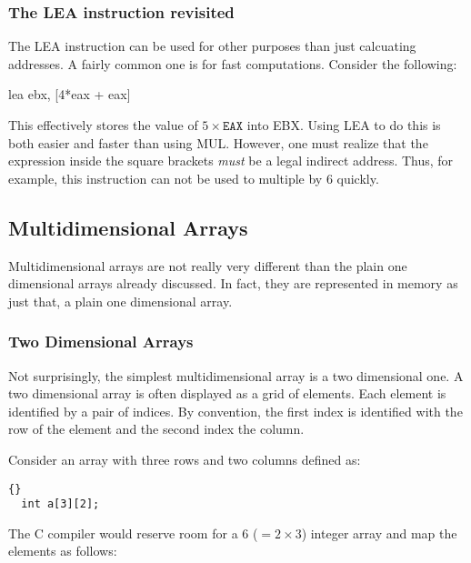 \subsubsection{The {\code LEA} instruction revisited}

The {\code LEA} instruction can be used for other purposes than just
calcuating addresses. A fairly
common one is for fast computations. Consider the following:
\begin{AsmCodeListing}[numbers=none,frame=none]
      lea    ebx, [4*eax + eax]
\end{AsmCodeListing}
This effectively stores the value of $5 \times \mathtt{EAX}$ into EBX.
Using {\code LEA} to do this is both easier and faster than using
{\code MUL}. However, one must realize that the expression
inside the square brackets \emph{must} be a legal indirect address.
Thus, for example, this instruction can not be used to multiple by 6
quickly.


\subsection{Multidimensional Arrays}

Multidimensional arrays are not really very different than the plain
one dimensional arrays already discussed. In fact, they are represented 
in memory as just that, a plain one dimensional array.

\subsubsection{Two Dimensional Arrays}
Not surprisingly, the simplest multidimensional array is a two dimensional
one. A two dimensional array is often displayed as a grid of elements. Each
element is identified by a pair of indices. By convention, the first index
is identified with the row of the element and the second index the column.

Consider an array with three rows and two columns defined as: 
\begin{lstlisting}[stepnumber=0]{}
  int a[3][2];
\end{lstlisting}
The C compiler would reserve room for a 6 ($= 2 \times 3$) integer array and
map the elements as follows:

